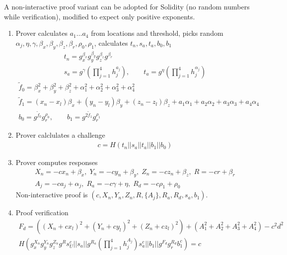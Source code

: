 \documentclass[a4paper,12pt]{article}
\begin{document}
A non-interactive proof variant can be adopted for Solidity
(no random numbers while verification),
modified to expect only positive exponents.

\begin{enumerate}
\item
  Prover calculates $a_1 \dots a_4$ from locations and threshold,
  picks random $\alpha_j, \eta, \gamma, \beta_x, \beta_y, \beta_z, \beta_r, \rho_0, \rho_1$, %
  calculates $t_n, s_a, t_a, b_0, b_1$
\begin{gather}
  t_n = g_x^{\beta_x} g_y^{\beta_y} g_z^{\beta_z} g^{\beta_r} \\
  s_a = g^{\gamma} (\prod_{j=1}^4 h_j^{a_j}),  \qquad
  t_a = g^{\eta} (\prod_{j=1}^4 h_j^{\alpha_j})
\end{gather}
\begin{multline}
  \tilde f_0 = \beta_x^2 + \beta_y^2 +\beta_z^2 + \alpha_1^2 + \alpha_2^2 + \alpha_3^2 + \alpha_4^2  \\
  \tilde f_1 = (x_n - x_l) \beta_x  + (y_n - y_l) \beta_y  + (z_n - z_l) \beta_z + a_1 \alpha_1 + a_2 \alpha_2 + a_3 \alpha_3 + a_4 \alpha_4 \\
  b_0 = g^{\tilde f_0} g_r^{\rho_0},   \qquad
  b_1 = g^{2 \tilde f_1} g_r^{\rho_1}
\end{multline}

\item
  Prover calclulates a challenge
\begin{gather}
  c = H(t_n || s_a || t_a || b_1 || b_0)
\end{gather}

\item
  Prover computes responses
\begin{multline}
  X_n = -c x_n + \beta_x,  \;
  Y_n = -c y_n + \beta_y,  \;
  Z_n = -c z_n + \beta_z,   \;
  R = -c r + \beta_r   \\
  A_j = -c a_j + \alpha_j, \;
  R_a = -c \gamma + \eta,   \;
  R_d = -c \rho_1 + \rho_0
\end{multline}
Non-interactive proof is
$(c, X_n, Y_n, Z_n, R, \{A_j\}, R_a, R_d, s_a, b_1)$.

\item
  Proof verification
\begin{multline}
\label{verf-chash}
  F_d = ((X_n + c x_l)^2 + (Y_n + c y_l)^2 + (Z_n + c z_l)^2) + (A_1^2 + A_2^2 + A_3^2 + A_4^2) - c^2 d^2 \\
  H(g_x^{X_n} g_y^{Y_n} g_z^{Z_n} g^{R} s_U^{c} ||
    s_a ||
    g^{R_a} (\prod_{j=1}^4 h_j^{A_j}) s_a^{c} ||
    b_1 ||
    g^{F_d} g_r^{R_d} b_1^c)
  = c
\end{multline}

\end{enumerate}
\end{document}
